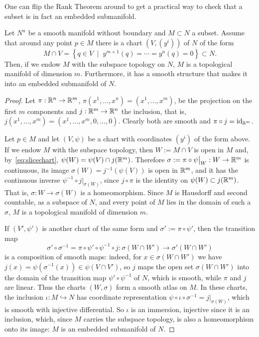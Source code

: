 One can flip the Rank Theorem around to get a practical way to check that a subset is in fact an embedded submanifold.
\begin{lemma}\label{lem:slice}
	Let $N^n$ be a smooth manifold without boundary and $M\subset N$ a subset.
	Assume that around any point $p\in M$ there is a chart $(V, (y^i))$ of $N$ of the form
	\begin{equation}\label{eq:slicechart}
		M\cap V = \left\{ q \in V \;\mid\; y^{m+1}(q)=\cdots=y^n(q)=0\right\} \subset N.
	\end{equation}
	Then, if we endow $M$ with the subspace topology on $N$, $M$ is a topological manifold of dimension $m$.
	Furthermore, it has a smooth structure that makes it into an embedded submanifold of $N$.
\end{lemma}

\begin{proof}
	Let $\pi: \mathbb{R}^n\to\mathbb{R}^m$, $\pi(x^1,\ldots,x^n) = (x^1,\ldots,x^m)$, be the projection on the first $m$ components and $j:\mathbb{R}^m\to\mathbb{R}^n$ the inclusion, that is, $j(x^1,\ldots,x^m) = (x^1,\ldots,x^m,0,\ldots,0)$. Clearly both are smooth and $\pi\circ j = \operatorname{id}_{\mathbb{R}^m}$.

	Let $p\in M$ and let $(V,\psi)$ be a chart with coordinates $(y^i)$ of the form above.
	If we endow $M$ with the subspace topology, then $W := M\cap V$ is open in $M$ and, by~\eqref{eq:slicechart}, $\psi(W) = \psi(V)\cap j(\mathbb{R}^m)$.
	Therefore $\sigma:= \pi \circ \psi\big|_{W}: W\to\mathbb{R}^m$ is continuous, its image $\sigma(W) = j^{-1}(\psi(V))$ is open in $\mathbb{R}^m$, and it has the continuous inverse $\psi^{-1}\circ j\big|_{\sigma(W)}$, since $j\circ\pi$ is the identity on $\psi(W)\subset j(\mathbb{R}^m)$.
	That is, $\sigma: W\to\sigma(W)$ is a homeomorphism.
	Since $M$ is Hausdorff and second countable, as a subspace of $N$, and every point of $M$ lies in the domain of such a $\sigma$, $M$ is a topological manifold of dimension $m$.

	If $(V',\psi')$ is another chart of the same form and $\sigma' := \pi \circ \psi'$, then the transition map
	\begin{equation}
		\sigma'\circ\sigma^{-1} = \pi\circ\psi'\circ\psi^{-1}\circ j : \sigma(W\cap W') \to \sigma'(W\cap W')
	\end{equation}
	is a composition of smooth maps: indeed, for $x\in\sigma(W\cap W')$ we have $j(x) = \psi(\sigma^{-1}(x))\in\psi(V\cap V')$, so $j$ maps the open set $\sigma(W\cap W')$ into the domain of the transition map $\psi'\circ\psi^{-1}$ of $N$, which is smooth, while $\pi$ and $j$ are linear.
	Thus the charts $(W,\sigma)$ form a smooth atlas on $M$.
	In these charts, the inclusion $\iota:M\hookrightarrow N$ has coordinate representation $\psi\circ\iota\circ\sigma^{-1} = j\big|_{\sigma(W)}$, which is smooth with injective differential.
	So $\iota$ is an immersion, injective since it is an inclusion, which, since $M$ carries the subspace topology, is also a homeomorphism onto its image: $M$ is an embedded submanifold of $N$.
\end{proof}

